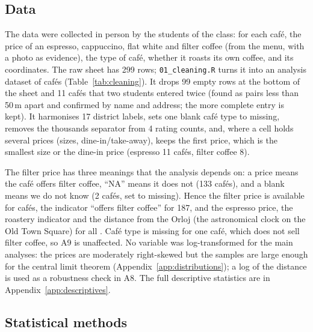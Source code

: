 \documentclass[11pt,a4paper]{article}
\begin{document}
\subsection{Data}

The data were collected in person by the students of the class: for each caf\'e, the price of an espresso, cappuccino, flat white and filter coffee (from the menu, with a photo as evidence), the type of caf\'e, whether it roasts its own coffee, and its coordinates. The raw sheet has 299 rows; \texttt{01\_cleaning.R} turns it into an analysis dataset of \Nall{} caf\'es (Table~\ref{tab:cleaning}). It drops 99 empty rows at the bottom of the sheet and 11 caf\'es that two students entered twice (found as pairs less than 50\,m apart and confirmed by name and address; the more complete entry is kept). It harmonises 17 district labels, sets one blank caf\'e type to missing, removes the thousands separator from 4 rating counts, and, where a cell holds several prices (sizes, dine-in/take-away), keeps the first price, which is the smallest size or the dine-in price (espresso 11 caf\'es, filter coffee 8).

The filter price has three meanings that the analysis depends on: a price means the caf\'e offers filter coffee, ``NA'' means it does not (133 caf\'es), and a blank means we do not know (2 caf\'es, set to missing). Hence the filter price is available for \Nfilter{} caf\'es, the indicator ``offers filter coffee'' for 187, and the espresso price, the roastery indicator and the distance from the Orloj (the astronomical clock on the Old Town Square) for all \Nall. Caf\'e type is missing for one caf\'e, which does not sell filter coffee, so A9 is unaffected. No variable was log-transformed for the main analyses: the prices are moderately right-skewed but the samples are large enough for the central limit theorem (Appendix~\ref{app:distributions}); a log of the distance is used as a robustness check in A8. The full descriptive statistics are in Appendix~\ref{app:descriptives}.

\begin{table}[H]
\centering\small
\caption{Cleaning steps applied by \texttt{01\_cleaning.R} and the number of caf\'es affected.}
\label{tab:cleaning}

\end{table}

\subsection{Statistical methods}
\end{document}
